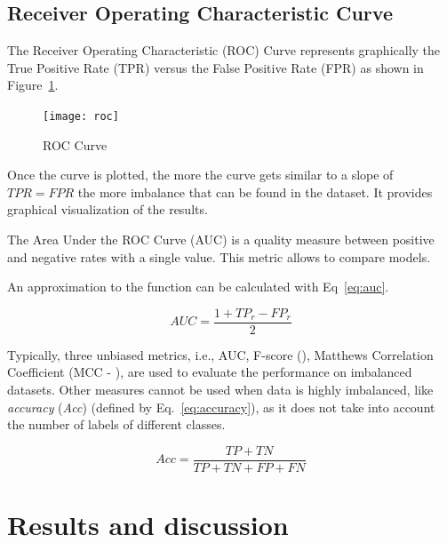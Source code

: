 \subsection{Receiver Operating Characteristic Curve}\label{sec:roc}

The Receiver Operating Characteristic (ROC)\cite{Fawcett2006} Curve represents 
graphically the True Positive Rate (TPR) versus the False Positive Rate (FPR) as 
shown in Figure~\ref{fig:roc}.

\begin{figure}
\centering
\texttt{[image: roc]} %
\caption{ROC Curve}
\label{fig:roc}
\end{figure}

Once the curve is plotted, the more the curve gets similar to a slope of 
$TPR = FPR$ the more imbalance that can be found in the dataset. It provides
graphical visualization of the results. 

The Area Under the ROC Curve (AUC) is a quality measure between positive and 
negative rates with a single value. This metric allows to compare models.

An approximation to the function can be calculated with Eq~\ref{eq:auc}.

\begin{equation}\label{eq:auc}
    AUC = \frac{1 + TP_{r} - FP_{r}}{2}
\end{equation}


Typically, three unbiased metrics, i.e., AUC, F-score 
(\cite{sorensen1948,dice1945}), Matthews Correlation Coefficient 
(MCC - \cite{Matthews1975}), are used to evaluate the performance on imbalanced 
datasets. Other measures cannot be used when data is highly imbalanced, like 
\textit{accuracy} (\textit{Acc}) (defined by Eq.~\ref{eq:accuracy}), as it does 
not take into account the number of labels of different classes.

\begin{equation}\label{eq:accuracy}
    Acc = \frac{TP + TN}{TP + TN + FP + FN}
\end{equation}

\section{Results and discussion}\label{sec:results}


